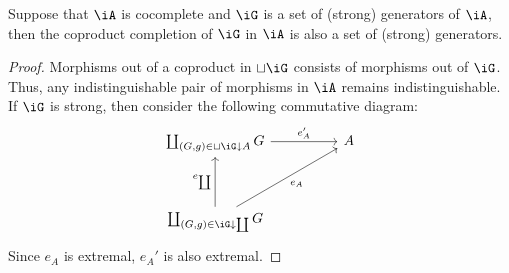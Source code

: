 \documentclass{zett}
\begin{document}
\begin{lem}\label{lem:coproduct-completion-generator}
  Suppose that $\iA$ is cocomplete and $\iG$ is a set of (strong) generators of $\iA$, then the coproduct completion of $\iG$ in $\iA$ is also a set of (strong) generators.
\end{lem}
\begin{proof}
  Morphisms out of a coproduct in $\sqcup\iG$ consists of morphisms out of $\iG$.
  Thus, any indistinguishable pair of morphisms in $\iA$ remains indistinguishable.
  If $\iG$ is strong, then consider the following commutative diagram:
  \[
    \begin{tikzcd}
      {\coprod_{(G,g) \in \sqcup\iG \dn A}G} && A \\
      \\
      {\coprod_{(G,g) \in \iG \dn \coprod}G}
      \arrow["{e_{A}'}", from=1-1, to=1-3]
      \arrow["{e_{A}}"', from=3-1, to=1-3]
      \arrow["{e_{\coprod}}", from=3-1, to=1-1]
    \end{tikzcd}
  \]
  Since $e_{A}$ is extremal, $e_{A}'$ is also extremal.
\end{proof}
\end{document}
